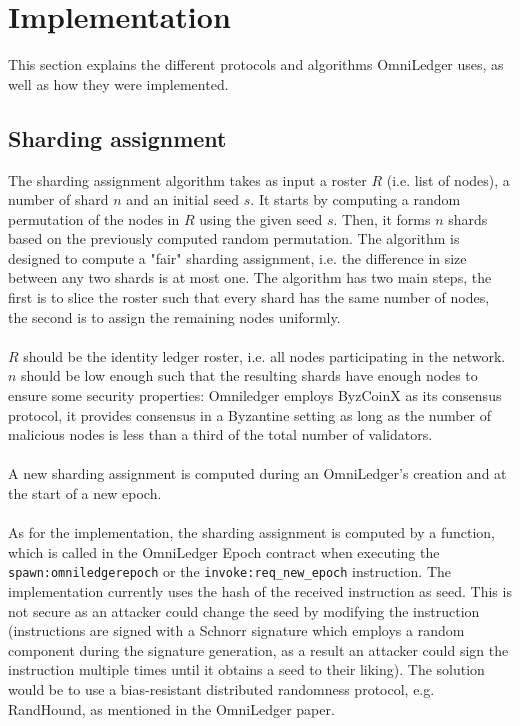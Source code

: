 \section{Implementation} \label{implementation}
This section explains the different protocols and algorithms OmniLedger uses, as well as how they were implemented.

\subsection{Sharding assignment} \label{sharding}
The sharding assignment algorithm takes as input a roster $R$ (i.e. list of nodes), a number of shard $n$ and an initial seed $s$. It starts by computing a random permutation of the nodes in $R$ using the given seed $s$. Then, it forms $n$ shards based on the previously computed random permutation. The algorithm is designed to compute a "fair" sharding assignment, i.e. the difference in size between any two shards is at most one. The algorithm has two main steps, the first is to slice the roster such that every shard has the same number of nodes, the second is to assign the remaining nodes uniformly. \\\\
$R$ should be the identity ledger roster, i.e. all nodes participating in the network. $n$ should be low enough such that the resulting shards have enough nodes to ensure some security properties: Omniledger employs ByzCoinX\cite{kokoris-kogias_enhancing_2016} as its consensus protocol, it provides consensus in a Byzantine setting as long as the number of malicious nodes is less than a third of the total number of validators. \\\\
A new sharding assignment is computed during an OmniLedger's creation and at the start of a new epoch. \\\\
As for the implementation, the sharding assignment is computed by a function, which is called in the OmniLedger Epoch contract when executing the \texttt{spawn:omniledgerepoch} or the \texttt{invoke:req\_new\_epoch} instruction. The implementation currently uses the hash of the received instruction as seed. This is not secure as an attacker could change the seed by modifying the instruction (instructions are signed with a Schnorr signature which employs a random component during the signature generation, as a result an attacker could sign the instruction multiple times until it obtains a seed to their liking). The solution would be to use a bias-resistant distributed randomness protocol, e.g. RandHound\cite{cryptoeprint:2016:1067}, as mentioned in the OmniLedger paper.

